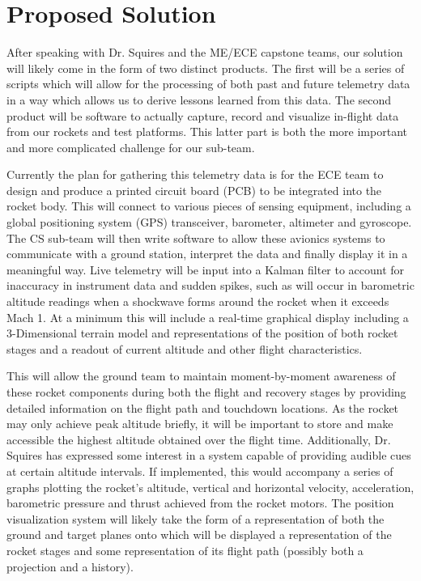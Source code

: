 \documentclass[onecolumn, draftclsnofoot,10pt, compsoc]{IEEEtran}
\begin{document}
\section{Proposed Solution}

After speaking with Dr. Squires and the ME/ECE capstone teams, our solution will likely come in the form of two distinct products. 
The first will be a series of scripts which will allow for the processing of both past and future telemetry data in a way which allows us to derive lessons learned from this data. 
The second product will be software to actually capture, record and visualize in-flight data from our rockets and test platforms. 
This latter part is both the more important and more complicated challenge for our sub-team.

Currently the plan for gathering this telemetry data is for the ECE team to design and produce a printed circuit board (PCB) to be integrated into the rocket body. 
This will connect to various pieces of sensing equipment, including a global positioning system (GPS) transceiver, barometer, altimeter and gyroscope. 
The CS sub-team will then write software to allow these avionics systems to communicate with a ground station, interpret the data and finally display it in a meaningful way.
Live telemetry will be input into a Kalman filter to account for inaccuracy in instrument data and sudden spikes, such as will occur in barometric altitude readings when a shockwave forms around the rocket when it exceeds Mach 1.  
At a minimum this will include a real-time graphical display including a 3-Dimensional terrain model and representations of the position of both rocket stages and a readout of current altitude and other flight characteristics.

This will allow the ground team to maintain moment-by-moment awareness of these rocket components during both the flight and recovery stages by providing detailed information on the flight path and touchdown locations.
As the rocket may only achieve peak altitude briefly, it will be important to store and make accessible the highest altitude obtained over the flight time. 
Additionally, Dr. Squires has expressed some interest in a system capable of providing audible cues at certain altitude intervals.
If implemented, this would accompany a series of graphs plotting the rocket’s altitude, vertical and horizontal velocity, acceleration, barometric pressure and thrust achieved from the rocket motors.
The position visualization system will likely take the form of a representation of both the ground and target planes onto which will be displayed a representation of the rocket stages and some representation of its flight path (possibly both a projection and a history).
\end{document}
